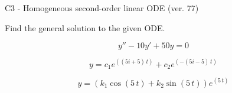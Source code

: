 \begin{exercise}
  \begin{exerciseTitle}C3 - Homogeneous second-order linear ODE (ver. 77)\end{exerciseTitle}
  \begin{exerciseStatement}
    
Find the general solution to the given ODE.

    
\[y''-10y'+50y = 0\]

  \end{exerciseStatement}
  \begin{exerciseAnswer}
    
\[y= c_{1} e^{\left(\left(5 i + 5\right) \, t\right)} + c_{2} e^{\left(-\left(5 i - 5\right) \, t\right)}\]

    
\[y= {\left(k_{1} \cos\left(5 \, t\right) + k_{2} \sin\left(5 \, t\right)\right)} e^{\left(5 \, t\right)}\]

  \end{exerciseAnswer}
\end{exercise}